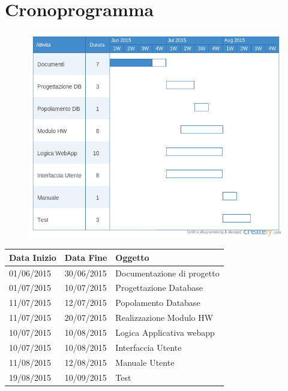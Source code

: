 \documentclass[a4paper,12pt]{article}
\begin{document}
\section{Cronoprogramma}
\begin{figure}[htbp]
\centering
\includegraphics[trim={0 0.66cm 0 0}, clip, scale=0.5]{gantt.png}
\end{figure}
\begin{table}[ht]
\begin{center}
\begin{tabular}{l | l | l}
\rowcolor{Ash}
\hline
Data Inizio        & Data Fine	      &  	Oggetto	     \\ \hline
01/06/2015 & 30/06/2015 & Documentazione di progetto  \\ \hline
01/07/2015 & 10/07/2015 & Progettazione Database	     \\ \hline
11/07/2015 & 12/07/2015 & Popolamento Database	     \\ \hline
11/07/2015 & 20/07/2015 & Realizzazione Modulo HW    \\ \hline
10/07/2015 & 10/08/2015 & Logica Applicativa webapp    \\ \hline
10/07/2015 & 10/08/2015 & Interfaccia Utente			     \\ \hline
11/08/2015 & 12/08/2015 & Manuale Utente			     \\ \hline
19/08/2015 & 10/09/2015 & Test						     \\ 
\hline
\end{tabular}
\end{center}
\end{table}
\end{document}
